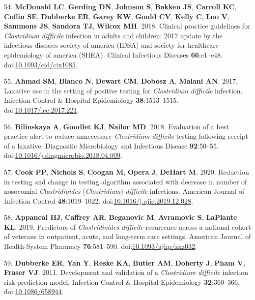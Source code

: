 \documentclass[
  11pt,
]{article}
\begin{document}
\leavevmode\hypertarget{ref-McDonald2018b}{}%
54. \textbf{McDonald LC}, \textbf{Gerding DN}, \textbf{Johnson S},
\textbf{Bakken JS}, \textbf{Carroll KC}, \textbf{Coffin SE},
\textbf{Dubberke ER}, \textbf{Garey KW}, \textbf{Gould CV},
\textbf{Kelly C}, \textbf{Loo V}, \textbf{Sammons JS}, \textbf{Sandora
TJ}, \textbf{Wilcox MH}. 2018. Clinical practice guidelines for
\emph{Clostridium difficile} infection in adults and children: 2017
update by the infectious diseases society of america (IDSA) and society
for healthcare epidemiology of america (SHEA). Clinical Infectious
Diseases \textbf{66}:e1--e48.
doi:\href{https://doi.org/10.1093/cid/cix1085}{10.1093/cid/cix1085}.

\leavevmode\hypertarget{ref-Ahmad2017}{}%
55. \textbf{Ahmad SM}, \textbf{Blanco N}, \textbf{Dewart CM},
\textbf{Dobosz A}, \textbf{Malani AN}. 2017. Laxative use in the setting
of positive testing for \emph{Clostridium difficile} infection.
Infection Control \& Hospital Epidemiology \textbf{38}:1513--1515.
doi:\href{https://doi.org/10.1017/ice.2017.221}{10.1017/ice.2017.221}.

\leavevmode\hypertarget{ref-Bilinskaya2018}{}%
56. \textbf{Bilinskaya A}, \textbf{Goodlet KJ}, \textbf{Nailor MD}.
2018. Evaluation of a best practice alert to reduce unnecessary
\emph{Clostridium difficile} testing following receipt of a laxative.
Diagnostic Microbiology and Infectious Disease \textbf{92}:50--55.
doi:\href{https://doi.org/10.1016/j.diagmicrobio.2018.04.009}{10.1016/j.diagmicrobio.2018.04.009}.

\leavevmode\hypertarget{ref-Cook2020}{}%
57. \textbf{Cook PP}, \textbf{Nichols S}, \textbf{Coogan M},
\textbf{Opera J}, \textbf{DeHart M}. 2020. Reduction in testing and
change in testing algorithm associated with decrease in number of
nosocomial \emph{Clostridioides} (\emph{Clostridium}) \emph{difficile}
infections. American Journal of Infection Control
\textbf{48}:1019--1022.
doi:\href{https://doi.org/10.1016/j.ajic.2019.12.028}{10.1016/j.ajic.2019.12.028}.

\leavevmode\hypertarget{ref-Appaneal2019}{}%
58. \textbf{Appaneal HJ}, \textbf{Caffrey AR}, \textbf{Beganovic M},
\textbf{Avramovic S}, \textbf{LaPlante KL}. 2019. Predictors of
\emph{Clostridioides difficile} recurrence across a national cohort of
veterans in outpatient, acute, and long-term care settings. American
Journal of Health-System Pharmacy \textbf{76}:581--590.
doi:\href{https://doi.org/10.1093/ajhp/zxz032}{10.1093/ajhp/zxz032}.

\leavevmode\hypertarget{ref-Dubberke2011}{}%
59. \textbf{Dubberke ER}, \textbf{Yan Y}, \textbf{Reske KA},
\textbf{Butler AM}, \textbf{Doherty J}, \textbf{Pham V}, \textbf{Fraser
VJ}. 2011. Development and validation of a \emph{Clostridium difficile}
infection risk prediction model. Infection Control \& Hospital
Epidemiology \textbf{32}:360--366.
doi:\href{https://doi.org/10.1086/658944}{10.1086/658944}.
\end{document}
